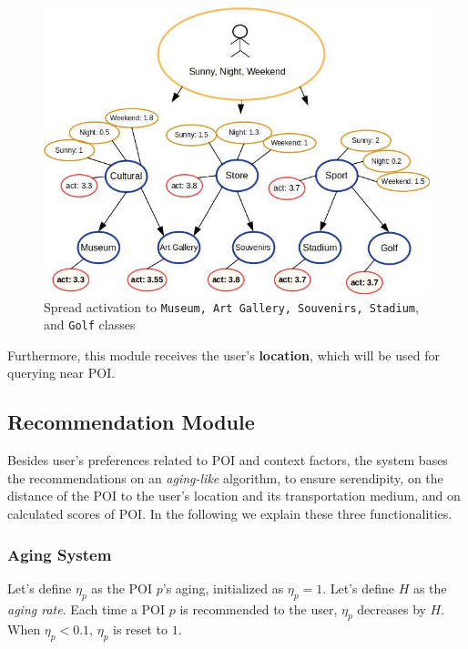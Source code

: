 \begin{figure}[h]
\centering
\includegraphics[scale=0.45]{draws/spread_act.jpg}
\caption{Spread activation to {\tt Museum, Art Gallery, Souvenirs, Stadium}, and {\tt Golf} classes}
\label{fig:spread_act}
\end{figure}

Furthermore, this module receives the user's \textbf{location}, which will be used for querying near POI.

\subsection{Recommendation Module}


Besides user's preferences related to POI and context factors, the system bases the recommendations on  an {\it aging-like} algorithm,  to ensure serendipity, on the distance of the POI to the user's location and its transportation medium, and on calculated scores of POI. In the following we explain these three functionalities.

\subsubsection{\bf Aging System}

Let's define $\eta_p$ as the POI $p$'s aging, initialized as $\eta_p = 1$. Let's define $H$ as the \textit{aging rate}. Each time a POI $p$ is recommended to the user, $\eta_p$ decreases by $H$. When $\eta_p < 0.1$, $\eta_p$ is reset to $1$. 

